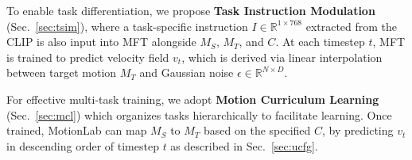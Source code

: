 To enable task differentiation, we propose \textbf{Task Instruction Modulation} (Sec.~\ref{sec:tsim}), where a task-specific instruction $I\in\mathbb{R}^{1\times768}$ extracted from the CLIP \cite{radford2021learning} is also input into MFT alongside $M_S$, $M_T$, and $C$. At each timestep $t$, MFT is trained to predict velocity field $v_t$, which is derived via linear interpolation between target motion $M_T$ and Gaussian noise $\epsilon \in \mathbb{R}^{N\times D}$. 

For effective multi-task training, we adopt \textbf{Motion Curriculum Learning} (Sec.~\ref{sec:mcl}) which organizes tasks hierarchically to facilitate learning. Once trained, MotionLab can map $M_S$ to $M_T$ based on the specified $C$, by predicting $v_t$ in descending order of timestep $t$ as described in Sec.~\ref{sec:ucfg}.




